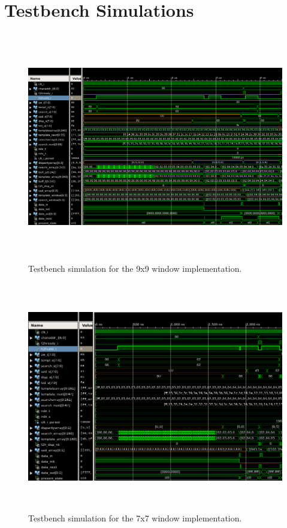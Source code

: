 \chapter{Testbench Simulations}
\label{sec:appdxD}

\begin{figure}
	\begin{center}
		\includegraphics[height=100mm]{figures/buffer_testbench_9x9_4.png}%
		\captionfonts
		\caption{Testbench simulation for the 9x9 window implementation.}
		\label{fig:tb_9x9}
	\end{center}
\end{figure}


\begin{figure}
	\begin{center}
		\includegraphics[height=100mm]{figures/buffer_testbench_7x7_2.png}
		\captionfonts
		\caption{Testbench simulation for the 7x7 window implementation.}
		\label{fig:tb_7x7}
	\end{center}
\end{figure}

